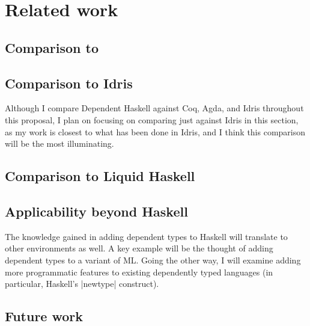 \chapter{Related work}
\label{cha:related}

\section{Comparison to \citet{gundry-thesis}}

\section{Comparison to Idris}

\begin{proposal}
Although I compare Dependent Haskell against Coq, Agda, and Idris throughout
this proposal, I plan on focusing on comparing just against Idris in this
section, as my work is closest to what has been done in Idris, and I think
this comparison will be the most illuminating.
\end{proposal}

\section{Comparison to Liquid Haskell}

\section{Applicability beyond Haskell}

\begin{proposal}
The knowledge gained in adding dependent types to Haskell will translate
to other environments as well. A key example will be the thought of adding
dependent types to a variant of ML. Going the other way, I will examine
adding more programmatic features to existing dependently typed languages
(in particular, Haskell's |newtype| construct).
\end{proposal}

\section{Future work}


